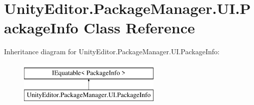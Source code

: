\hypertarget{class_unity_editor_1_1_package_manager_1_1_u_i_1_1_package_info}{}\section{Unity\+Editor.\+Package\+Manager.\+U\+I.\+Package\+Info Class Reference}
\label{class_unity_editor_1_1_package_manager_1_1_u_i_1_1_package_info}
Inheritance diagram for Unity\+Editor.\+Package\+Manager.\+U\+I.\+Package\+Info\+:\begin{figure}[H]
\begin{center}
\leavevmode
\includegraphics[height=2.000000cm]{class_unity_editor_1_1_package_manager_1_1_u_i_1_1_package_info}
\end{center}
\end{figure}
